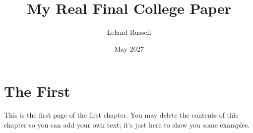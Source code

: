 \documentclass[
    12pt,
    twoside,
    bibstyle=ieee,
    bibfile=bibliography.bib,
    headerstyle=uppercase,
]{reedthesis}
\title{My Real Final College Paper}
\author{Leland Russell}
\date{May 2027}
\begin{document}
  \maketitle
  \frontmatter %
  \pagestyle{empty} %

   

	
    
   	
    \chapter{The First}
    	This is the first page of the first chapter. You may delete the contents of this chapter so you can add your own text; it's just here to show you some examples. 


    
\end{document}
